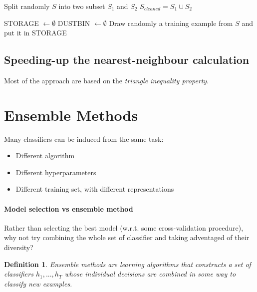 \documentclass{article}
\newtheorem{defi}{Definition}
\begin{document}
\begin{algorithm}
Split randomly $S$ into two subset $S_1$ and $S_2$\;
$S_{cleaned}=S_1\cup S_2$\;
\end{algorithm}

\begin{algorithm}
STORAGE $\leftarrow \emptyset$\;
DUSTBIN $\leftarrow \emptyset$\;
Draw randomly a training example from $S$ and put it in STORAGE\;
\end{algorithm}

\subsection{Speeding-up the nearest-neighbour calculation}
Most of the approach are based on the \emph{triangle inequality property}.
\section{Ensemble Methods}
Many classifiers can be induced from the same task:
\begin{itemize}[noitemsep]
\item Different algorithm
\item Different hyperparameters
\item Different training set, with different representations
\end{itemize}

\paragraph{Model selection vs ensemble method}
Rather than selecting the best model (w.r.t. some cross-validation procedure), why not try combining the whole set of classifier and taking adventaged of their diversity?


\begin{defi}
Ensemble methods are learning algorithms that constructs a set of classifiers $h_1,...,h_{T}$ whose individual decisions are combined in some way to classify new examples.
\end{defi}
\end{document}
